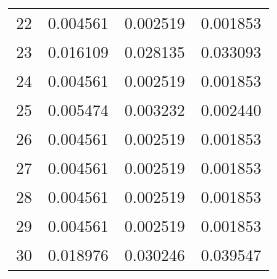 \begin{table}[H]
\begin{tabular}{llll}
22       & 0.004561          & 0.002519           & 0.001853           \\
23       & 0.016109          & 0.028135           & 0.033093           \\
24       & 0.004561          & 0.002519           & 0.001853           \\
25       & 0.005474          & 0.003232           & 0.002440           \\
26       & 0.004561          & 0.002519           & 0.001853           \\
27       & 0.004561          & 0.002519           & 0.001853           \\
28       & 0.004561          & 0.002519           & 0.001853           \\
29       & 0.004561          & 0.002519           & 0.001853           \\
30       & 0.018976          & 0.030246           & 0.039547           \\ \hline
\end{tabular}
\end{table}